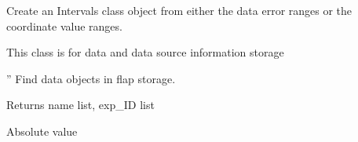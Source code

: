 \documentclass[letterpaper,10pt,english]{sphinxmanual}
\begin{document}
\begin{fulllineitems}
\begin{fulllineitems}
\end{fulllineitems}


\begin{fulllineitems}
\label{\detokenize{data_object:flap.data_object.DataObject.to_intervals}}
Create an Intervals class object from either the data error ranges or
the coordinate value ranges.

\end{fulllineitems}


\end{fulllineitems}


\begin{fulllineitems}
\label{\detokenize{data_object:flap.data_object.FlapStorage}}
This class is for data and data source information storage

\begin{fulllineitems}
\label{\detokenize{data_object:flap.data_object.FlapStorage.find_data_objects}}
”
Find data objects in flap storage.

Returns name list, exp\_ID list

\end{fulllineitems}


\end{fulllineitems}


\begin{fulllineitems}
\label{\detokenize{data_object:flap.data_object.abs_value}}
Absolute value

\end{fulllineitems}
\end{document}
